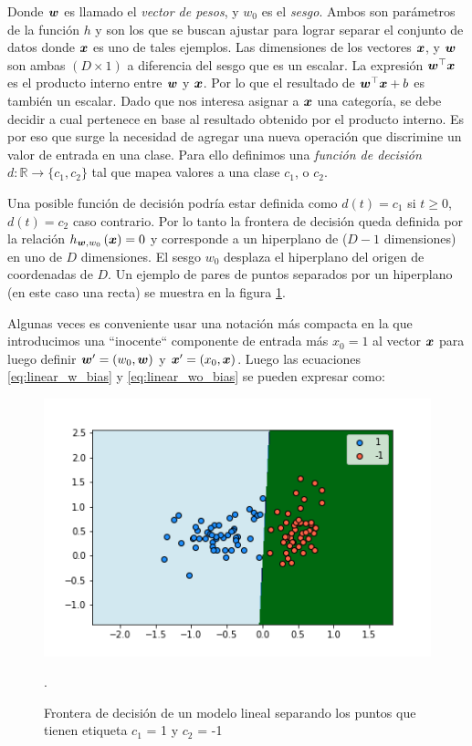 Donde $\boldsymbol{w}$ es llamado el \emph{vector de pesos}, y $w_0$ es el
\emph{sesgo}. Ambos son parámetros de la función $h$ y son los que se buscan
ajustar para lograr separar el conjunto de datos donde $\boldsymbol{x}$ es uno de
tales ejemplos. Las dimensiones de los vectores $\boldsymbol{x}$, y $\boldsymbol{w}$ son
ambas $(D \times 1)$ a diferencia del sesgo que es un escalar. La expresión
$\boldsymbol{w}^{\top} \boldsymbol{x}$ es el producto interno entre $\boldsymbol{w}$ y $\boldsymbol{x}$.
Por lo que el resultado de $\boldsymbol{w}^{\top} \boldsymbol{x} + b$ es también un escalar.
Dado que nos interesa asignar a $\boldsymbol{x}$ una categoría, se debe decidir a cual
pertenece en base al resultado obtenido por el producto interno. Es por eso que
surge la necesidad de agregar una nueva operación que discrimine un valor de
entrada en una clase. Para ello definimos una \emph{función de decisión} $d:
\mathbb{R} \rightarrow \{c_1, c_2\}$ tal que mapea valores a una clase $c_1$, o
$c_2$.

Una posible función de decisión podría estar definida como $d(t) = c_1$ si $t
\geq 0$, $d(t) = c_2$ caso contrario. Por lo tanto la frontera de decisión queda
definida por la relación $h_{\boldsymbol{w}, w_0}\left( \boldsymbol{x} \right) = 0$ y
corresponde a un hiperplano de ($D-1$ dimensiones) en uno de $D$ dimensiones. El
sesgo $w_0$ desplaza el hiperplano del origen de coordenadas de $D$. Un ejemplo de
pares de puntos separados por un hiperplano (en este caso una recta) se muestra
en la figura \ref{fig:linear_model_boundary}.

Algunas veces es conveniente usar una notación más compacta en la que
introducimos una ``inocente`` componente de entrada más $x_0 = 1$ al vector
$\boldsymbol{x}$ para luego definir $\boldsymbol{w}' = (w_0, \boldsymbol{w})$ y $\boldsymbol{x}' = (x_0,
\boldsymbol{x})$. Luego las ecuaciones \ref{eq:linear_w_bias} y
\ref{eq:linear_wo_bias} se pueden expresar como:

\begin{figure}
    \centering
    \includegraphics[scale=0.5]{figures/decision_boundary.png}
    \caption{Frontera de decisión de un modelo lineal separando los puntos que
    tienen etiqueta $c_1$ = 1 y $c_2$ = -1}.
    \label{fig:linear_model_boundary}
\end{figure}

